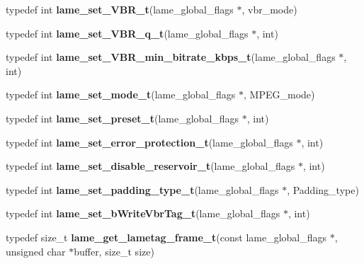 \begin{DoxyCompactItemize}
typedef int {\bfseries lame\+\_\+set\+\_\+\+V\+B\+R\+\_\+t}(lame\+\_\+global\+\_\+flags $\ast$, vbr\+\_\+mode)
\item 
\mbox{\label{namespace_ms_abb8e9252f450f6040c6c3510de20d634}} 
typedef int {\bfseries lame\+\_\+set\+\_\+\+V\+B\+R\+\_\+q\+\_\+t}(lame\+\_\+global\+\_\+flags $\ast$, int)
\item 
\mbox{\label{namespace_ms_a267767b3febf8531034599de2fb1c82a}} 
typedef int {\bfseries lame\+\_\+set\+\_\+\+V\+B\+R\+\_\+min\+\_\+bitrate\+\_\+kbps\+\_\+t}(lame\+\_\+global\+\_\+flags $\ast$, int)
\item 
\mbox{\label{namespace_ms_a0a4b16a5afed4e08f7b0fc3891040f2c}} 
typedef int {\bfseries lame\+\_\+set\+\_\+mode\+\_\+t}(lame\+\_\+global\+\_\+flags $\ast$, M\+P\+E\+G\+\_\+mode)
\item 
\mbox{\label{namespace_ms_a8bd3a7ff0682d578cee7148a7f8f9d74}} 
typedef int {\bfseries lame\+\_\+set\+\_\+preset\+\_\+t}(lame\+\_\+global\+\_\+flags $\ast$, int)
\item 
\mbox{\label{namespace_ms_a93bf46db4ba23f922a1e88856e58ec86}} 
typedef int {\bfseries lame\+\_\+set\+\_\+error\+\_\+protection\+\_\+t}(lame\+\_\+global\+\_\+flags $\ast$, int)
\item 
\mbox{\label{namespace_ms_a9de72d94098acabd9f59866873768c35}} 
typedef int {\bfseries lame\+\_\+set\+\_\+disable\+\_\+reservoir\+\_\+t}(lame\+\_\+global\+\_\+flags $\ast$, int)
\item 
\mbox{\label{namespace_ms_adb3d037b099a08b487b3ae8f36c02620}} 
typedef int {\bfseries lame\+\_\+set\+\_\+padding\+\_\+type\+\_\+t}(lame\+\_\+global\+\_\+flags $\ast$, Padding\+\_\+type)
\item 
\mbox{\label{namespace_ms_a8303080223d9fc036b0f16e660b7889a}} 
typedef int {\bfseries lame\+\_\+set\+\_\+b\+Write\+Vbr\+Tag\+\_\+t}(lame\+\_\+global\+\_\+flags $\ast$, int)
\item 
\mbox{\label{namespace_ms_a006f38b487fe95eda804bcf995d2c63b}} 
typedef size\+\_\+t {\bfseries lame\+\_\+get\+\_\+lametag\+\_\+frame\+\_\+t}(const lame\+\_\+global\+\_\+flags $\ast$, unsigned char $\ast$buffer, size\+\_\+t size)

\end{DoxyCompactItemize}
